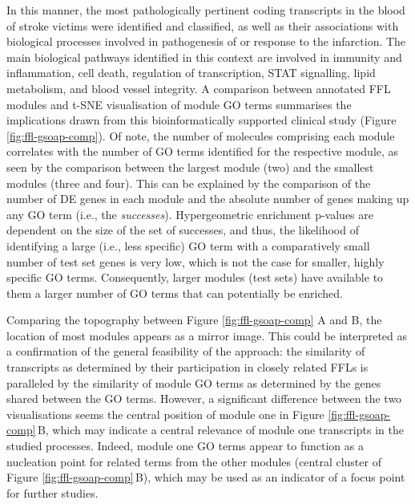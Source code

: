 In this manner, the most pathologically pertinent coding transcripts in the blood of stroke victims were identified and classified, as well as their associations with biological processes involved in pathogenesis of or response to the infarction. The main biological pathways identified in this context are involved in immunity and inflammation, cell death, regulation of transcription, STAT signalling, lipid metabolism, and blood vessel integrity. A comparison between annotated FFL modules and t-SNE visualisation of module GO terms summarises the implications drawn from this bioinformatically supported clinical study (Figure \ref{fig:ffl-gsoap-comp}). Of note, the number of molecules comprising each module correlates with the number of GO terms identified for the respective module, as seen by the comparison between the largest module (two) and the smallest modules (three and four). This can be explained by the comparison of the number of DE genes in each module and the absolute number of genes making up any GO term (i.e., the \emph{successes}). Hypergeometric enrichment p-values are dependent on the size of the set of successes, and thus, the likelihood of identifying a large (i.e., less specific) GO term with a comparatively small number of test set genes is very low, which is not the case for smaller, highly specific GO terms. Consequently, larger modules (test sets) have available to them a larger number of GO terms that can potentially be enriched.

Comparing the topography between Figure \ref{fig:ffl-gsoap-comp} A and B, the location of most modules appears as a mirror image. This could be interpreted as a confirmation of the general feasibility of the approach: the similarity of transcripts as determined by their participation in closely related FFLs is paralleled by the similarity of module GO terms as determined by the genes shared between the GO terms. However, a significant difference between the two visualisations seems the  central position of module one in Figure \ref{fig:ffl-gsoap-comp}\,B, which may indicate a central relevance of module one transcripts in the studied processes. Indeed, module one GO terms appear to function as a nucleation point for related terms from the other modules (central cluster of Figure \ref{fig:ffl-gsoap-comp}\,B), which may be used as an indicator of a focus point for further studies.

